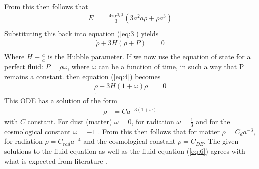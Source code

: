 \documentclass[a4paper, 11pt]{FSKH_623_Report}
\numberwithin{equation}{section}
\begin{document}
From this then follows that
\begin{equation}
\begin{split}
\dot{E} &= \frac{4\pi\chi^{3} c^{2}}{3}\left(3a^{2}\dot{a}\rho+\dot{\rho}a^{3}\right)\\
\end{split}
\end{equation}
Substituting this back into equation (\ref{eq:3}) yields
\begin{equation}\label{eq:4}
\begin{split}
\dot{\rho}+3H\left(\rho+P\right) &= 0\\
\end{split}
\end{equation}
Where $H\equiv\frac{\dot{a}}{a}$ is the Hubble parameter.
If we now use the equation of state for a perfect fluid: $P=\rho\omega$, where $\omega$ can be a function of time, in such a way that P remains a constant.
then equation (\ref{eq:4}) becomes
\begin{equation}\label{eq:6}
\begin{split}
\dot{\rho}+3H\left(1+\omega\right)\rho &= 0\\.
\end{split}
\end{equation}
This ODE has a solution of the form  
\begin{equation}
\begin{split}
\rho &= Ca^{-3\left(1+\omega\right)}
\end{split}
\end{equation}
with $C$ constant.
For dust (matter) $\omega=0$, for radiation $\omega=\frac{1}{3}$ and for the cosmological constant $\omega=-1$ \citep{notes4, GRFD}. From this then follows that for matter $\rho = C_{d}a^{-3}$, for radiation $\rho = C_{rad}a^{-4}$ and the cosmological constant $\rho = C_{DE}$. 
The given solutions to the fluid equation as well as the fluid equation (\ref{eq:6}) agrees with what is expected from literature \citep{GRFD, ITC}. 
\end{document}
